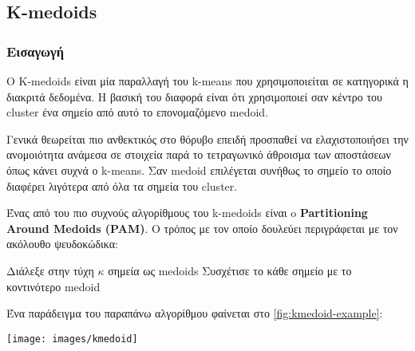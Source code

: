 \subsection{Κ-medoids}
\subsubsection{Εισαγωγή}
Ο K-medoids είναι μία παραλλαγή του k-means που χρησιμοποιείται σε κατηγορικά η διακριτά δεδομένα.
Η βασική του διαφορά είναι ότι χρησιμοποιεί σαν κέντρο του cluster ένα σημείο από αυτό το επονομαζόμενο medoid.

Γενικά θεωρείται πιο ανθεκτικός στο θόρυβο επειδή προσπαθεί να ελαχιστοποιήσει την ανομοιότητα ανάμεσα σε στοιχεία παρά το τετραγωνικό άθροισμα των αποστάσεων όπως κάνει συχνά ο k-means.
Σαν medoid επιλέγεται συνήθως το σημείο το οποίο διαφέρει λιγότερα από όλα τα σημεία του cluster.

Ένας από του πιο συχνούς αλγορίθμους του k-medoids είναι o \textbf{Partitioning Around Medoids (PAM)}.
Ο τρόπος με τον οποίο δουλεύει
περιγράφεται με τον ακόλουθο ψευδοκώδικα:\\
\begin{algorithm}[H]
    Διάλεξε στην τύχη $\kappa$ σημεία ως medoids\;
    Συσχέτισε το κάθε σημείο με το κοντινότερο medoid\;
\end{algorithm}

Ένα παράδειγμα του παραπάνω αλγορίθμου φαίνεται στο 
\hyperref[fig:kmedoid-example]{\figurename{} \ref{fig:kmedoid-example}}:

\noindent\begin{minipage}{\linewidth}
    \centering
	\texttt{[image: images/kmedoid]}
	\label{fig:kmedoid-example}
\end{minipage}

